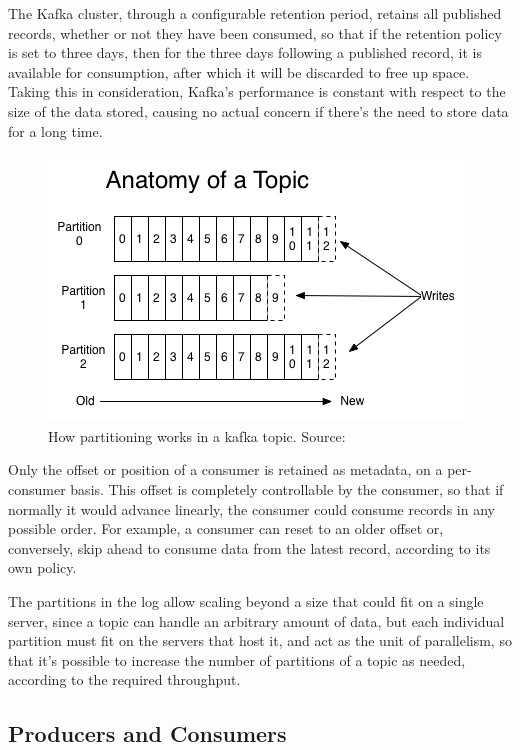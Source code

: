 The Kafka cluster, through a configurable retention period, retains all published records, whether or not they have been consumed, so that if the retention policy is set to three days, then for the three days following a published record, it is available for consumption, after which it will be discarded to free up space. Taking this in consideration, Kafka's performance is constant with respect to the size of the data stored, causing no actual concern if there's the need to store data for a long time.


\begin{figure}[h]
    \centering
    \includegraphics[width=0.7\linewidth]{Figures/log_anatomy}
    \caption[How partition works in kafka a topic]{How partitioning works in a kafka topic. Source: \cite{kafka_doc}}
    \label{fig:loganatomy}
\end{figure}

Only the offset or position of a consumer is retained as metadata, on a per-consumer basis. This offset is completely controllable by the consumer, so that if normally it would advance linearly, the consumer could consume records in any possible order. For example, a consumer can reset to an older offset or, conversely, skip ahead to consume data from the latest record, according to its own policy.

The partitions in the log allow scaling beyond a size that could fit on a single server, since a topic can handle an arbitrary amount of data, but each individual partition must fit on the servers that host it, and act as the unit of parallelism, so that it's possible to increase the number of partitions of a topic as needed, according to the required throughput.

\subsection{Producers and Consumers}

